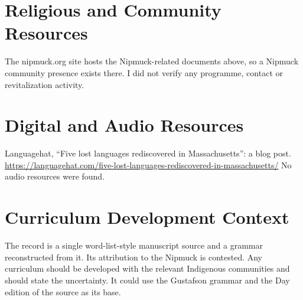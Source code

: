 \documentclass[12pt]{article}
\begin{document}
\section{Religious and Community Resources}
The nipmuck.org site hosts the Nipmuck-related documents above, so a Nipmuck community presence exists there. I did not verify any programme, contact or revitalization activity.

\section{Digital and Audio Resources}
Languagehat, ``Five lost languages rediscovered in Massachusetts'': a blog post. \url{https://languagehat.com/five-lost-languages-rediscovered-in-massachusetts/}
No audio resources were found.

\section{Curriculum Development Context}
The record is a single word-list-style manuscript source and a grammar reconstructed from it. Its attribution to the Nipmuck is contested. Any curriculum should be developed with the relevant Indigenous communities and should state the uncertainty. It could use the Gustafson grammar and the Day edition of the source as its base.
\end{document}
